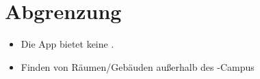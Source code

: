 \section{Abgrenzung}

\begin{itemize}

    \item Die App bietet keine %
    . 
    \item Finden von Räumen/Gebäuden außerhalb des %
    -Campus

\end{itemize}